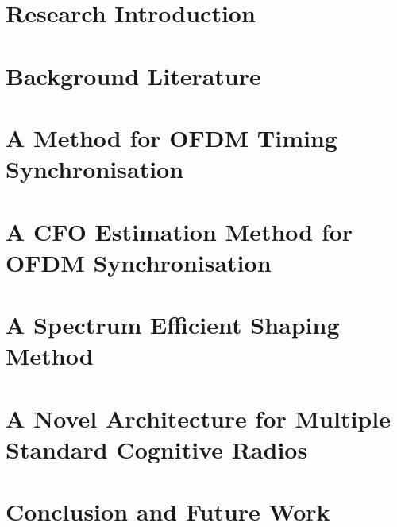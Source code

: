 \chapter{Research Introduction}
\label{chap:introduction}
%
\chapter{Background Literature}
\label{chap:BackgroundLiterature}



%
\chapter{A Method for OFDM Timing Synchronisation}
\label{chap:Synchronisation}
%
\chapter{A CFO Estimation Method for OFDM Synchronisation}
\label{chap:CFO}
%
\chapter{A Spectrum Efficient Shaping Method}
\label{chap:SpectralLeakage}
%
\chapter{A Novel Architecture for Multiple Standard Cognitive Radios}
\label{chap:MSCR}
%
\chapter{Conclusion and Future Work}
\label{chap:conclusion}



\appendix
%

\newpage
{}








